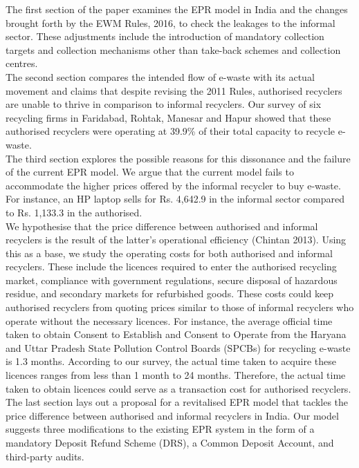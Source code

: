 \documentclass[a4paper, 12pt]{article}
\begin{document}
                    The first section of the paper examines the EPR model in India and the changes brought forth by the EWM Rules, 2016, to check the leakages to the informal sector. These adjustments include the introduction of mandatory collection targets and collection mechanisms other than take-back schemes and collection centres. \\
                    
                   The second section compares the intended flow of e-waste with its actual movement and claims that despite revising the 2011 Rules, authorised recyclers are unable to thrive in comparison to informal recyclers. Our survey of six recycling firms in Faridabad, Rohtak, Manesar and Hapur showed that these authorised recyclers were operating at 39.9\% of their total capacity to recycle e-waste. \\
                   
                   The third section explores the possible reasons for this dissonance and the failure of the current EPR model. We argue that the current model fails to accommodate the higher prices offered by the informal recycler to buy e-waste. For instance, an HP laptop sells for Rs. 4,642.9 in the informal sector compared to Rs. 1,133.3 in the authorised.\\
                   
                   We hypothesise that the price difference between authorised and informal recyclers is the result of the latter’s operational efficiency (Chintan 2013). Using this as a base, we study the operating costs for both authorised and informal recyclers. These include the licences required to enter the authorised recycling market, compliance with government regulations, secure disposal of hazardous residue, and secondary markets for refurbished goods. These costs could keep authorised recyclers from quoting prices similar to those of informal recyclers who operate without the necessary licences. For instance, the average official time taken to obtain Consent to Establish and Consent to Operate from the Haryana and Uttar Pradesh State Pollution Control Boards (SPCBs) for recycling e-waste is 1.3 months. According to our survey, the actual time taken to acquire these licences ranges from less than 1 month to 24 months. Therefore, the actual time taken to obtain licences could serve as a transaction cost for authorised recyclers.\\
                    
                    The last section lays out a proposal for a revitalised EPR model that tackles the price difference between authorised and informal recyclers in India. Our model suggests three modifications to the existing EPR system in the form of a mandatory Deposit Refund Scheme (DRS), a Common Deposit Account, and third-party audits.\\
                    
\end{document}
